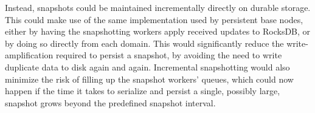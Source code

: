Instead, snapshots could be maintained incrementally directly on durable
storage. This could make use of the same  implementation
used by persistent base nodes, either by having the snapshotting workers apply
received updates to RocksDB, or by doing so directly from each domain. This
would significantly reduce the write-amplification required to persist a
snapshot, by avoiding the need to write duplicate data to disk again and again.
Incremental snapshotting would also minimize the risk of filling up the snapshot
workers' queues, which could now happen if the time it takes to serialize and
persist a single, possibly large, snapshot grows beyond the predefined snapshot
interval.
